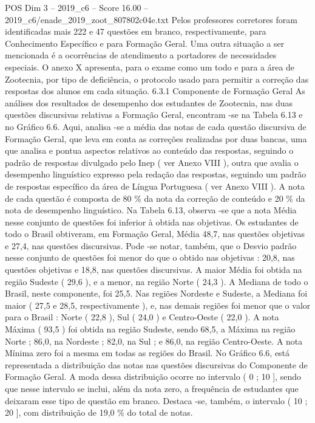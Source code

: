 \begin{textsample}{POS Dim 3 – 2019\_c6 – Score 16.00 – 2019\_c6/enade\_2019\_zoot\_807802c04e.txt}
Pelos professores corretores foram identificadas mais 222 e 47 questões em branco, respectivamente, para Conhecimento Específico e para Formação Geral.
Uma outra situação a ser mencionada é a ocorrências de atendimento a portadores de necessidades especiais.
O anexo X apresenta, para o exame como um todo e para a área de Zootecnia, por tipo de deficiência, o protocolo usado para permitir a correção das respostas dos alunos em cada situação. 6.3.1 Componente de Formação Geral As análises dos resultados de desempenho dos estudantes de Zootecnia, nas duas questões discursivas relativas a Formação Geral, encontram -se na Tabela 6.13 e no Gráfico 6.6.
Aqui, analisa -se a média das notas de cada questão discursiva de Formação Geral, que leva em conta as correções realizadas por duas bancas, uma que analisa e pontua aspectos relativos ao conteúdo das respostas, seguindo o padrão de respostas divulgado pelo Inep ( ver Anexo VIII ), outra que avalia o desempenho linguístico expresso pela redação das respostas, seguindo um padrão de respostas específico da área de Língua Portuguesa ( ver Anexo VIII ).
A nota de cada questão é composta de 80 \% da nota da correção de conteúdo e 20 \% da nota de desempenho linguístico.
Na Tabela 6.13, observa -se que a nota Média nesse conjunto de questões foi inferior à obtida nas objetivas.
Os estudantes de todo o Brasil obtiveram, em Formação Geral, Média 48,7, nas questões objetivas e 27,4, nas questões discursivas.
Pode -se notar, também, que o Desvio padrão nesse conjunto de questões foi menor do que o obtido nas objetivas : 20,8, nas questões objetivas e 18,8, nas questões discursivas.
A maior Média foi obtida na região Sudeste ( 29,6 ), e a menor, na região Norte ( 24,3 ).
A Mediana de todo o Brasil, neste componente, foi 25,5.
Nas regiões Nordeste e Sudeste, a Mediana foi maior ( 27,5 e 28,5, respectivamente ), e, nas demais regiões foi menor que o valor para o Brasil : Norte ( 22,8 ), Sul ( 24,0 ) e Centro-Oeste ( 22,0 ).
A nota Máxima ( 93,5 ) foi obtida na região Sudeste, sendo 68,5, a Máxima na região Norte ; 86,0, na Nordeste ; 82,0, na Sul ; e 86,0, na região Centro-Oeste.
A nota Mínima zero foi a mesma em todas as regiões do Brasil.
No Gráfico 6.6, está representada a distribuição das notas nas questões discursivas do Componente de Formação Geral.
A moda dessa distribuição ocorre no intervalo ( 0 ; 10 ], sendo que nesse intervalo se inclui, além da nota zero, a frequência de estudantes que deixaram esse tipo de questão em branco.
Destaca -se, também, o intervalo ( 10 ; 20 ], com distribuição de 19,0 \% do total de notas.

\end{textsample}
